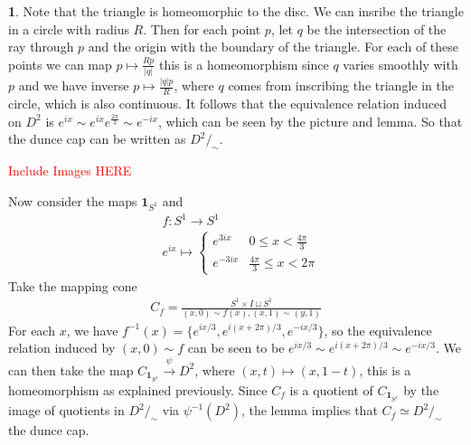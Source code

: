 \documentclass[10.5pt]{article}
\theoremstyle{definition}
\newtheorem{pb}{}
\newcommand{\set}[1]{\{#1\}}
\newcommand{\abs}[1]{\lvert#1\rvert}
\newcommand{\ism}{\simeq}
\begin{document}
    \begin{pb}
        Note that the triangle is homeomorphic to the disc. We can insribe the triangle in a circle with radius \(R\). Then for each point \(p\), let \(q\) be the intersection
        of the ray through \(p \) and the origin with the boundary of the triangle. For each of these points we can map \(p \mapsto \frac{Rp }{\abs{q }}\) this is a homeomorphism
        since \(q\) varies smoothly with \(p\) and we have inverse \(p \mapsto \frac{\abs{q}p}{R}\), where \(q\) comes from inscribing the triangle in the circle, which is also continuous.
        It follows that the equivalence relation induced on \(D^2\) is \(e^{ix} \sim e^{ix}e^{\frac{2\pi}{3}} \sim e^{-ix}\), which can be seen by the picture and lemma. So that
        the dunce cap can be written as \(D^2/_\sim\).

        \textcolor{red}{Include Images HERE}

        Now consider the maps \(\mathbf{1}_{S^1}\) and
        \begin{align*}
            &f:S^1 \to S^1 \\
            &e^{ix} \mapsto \begin{cases}
                e^{3ix} & 0 \leq x < \frac{4\pi}{3} \\
                e^{-3ix} & \frac{4\pi}{3} \leq x < 2\pi
            \end{cases}
        \end{align*}
        Take the mapping cone 
        \begin{align*}
            C_f = \frac{S^1 \times I \sqcup S^1}{(x,0) \sim f(x), (x,1) \sim (y,1)}
        \end{align*}
        For each \(x\), we have \(f^{-1}(x) = \set{e^{ix/3},e^{i(x + 2\pi)/3},e^{-ix/3}}\), so the equivalence relation induced by \((x,0) \sim f\) can be seen to be 
        \(e^{ix/3}\sim e^{i(x + 2\pi)/3}\sim e^{-ix/3}\). 
        We can then take the map \(C_{\mathbf{1}_{S^1}} \overset{\psi}{\to} D^2\), where \((x,t) \mapsto (x,1-t)\), this is a homeomorphism as explained previously. 
        Since \(C_f\) is a quotient of \(C_{\mathbf{1}_{S^1}}\) by the image of quotients in \(D^2/_\sim\) via \(\psi^{-1}(D^2)\), the lemma implies that \(C_f \ism D^2/_\sim\) the dunce cap.


\end{pb}
\end{document}
